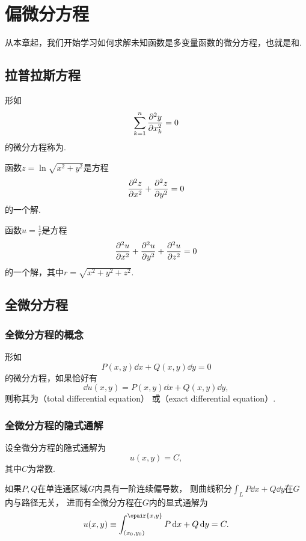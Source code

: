 \chapter{偏微分方程}
从本章起，我们开始学习如何求解未知函数是多变量函数的微分方程，也就是和.

\section{拉普拉斯方程}
\begin{definition}
形如\[
\sum\limits_{k=1}^n \pdv[2]{y}{x_k} = 0
\]的微分方程称为.
\end{definition}

\begin{example}
函数\(z=\ln\sqrt{x^2+y^2}\)是方程\[
\pdv[2]{z}{x} + \pdv[2]{z}{y} = 0
\]的一个解.
\end{example}

\begin{example}
函数\(u=\frac{1}{r}\)是方程\[
\pdv[2]{u}{x} + \pdv[2]{u}{y} + \pdv[2]{u}{z} = 0
\]的一个解，其中\(r=\sqrt{x^2+y^2+z^2}\).
\end{example}

\section{全微分方程}
\subsection{全微分方程的概念}
\begin{definition}
形如\[
P(x,y)\dd{x} + Q(x,y)\dd{y} = 0
\]的微分方程，如果恰好有\[
\dd{u(x,y)} = P(x,y)\dd{x} + Q(x,y)\dd{y},
\]则称其为（total differential equation）%
或（exact differential equation）.
\end{definition}

\subsection{全微分方程的隐式通解}
设全微分方程的隐式通解为\[
u(x,y) = C,
\]其中\(C\)为常数.

如果\(P,Q\)在单连通区域\(G\)内具有一阶连续偏导数，
则曲线积分\(\int_L P\dd{x}+Q\dd{y}\)在\(G\)内与路径无关，
进而有全微分方程在\(G\)内的显式通解为\[
u(x,y) \equiv \int_{(x_0,y_0)}^{\opair{x,y}} P\dd{x}+Q\dd{y} = C.
\]

